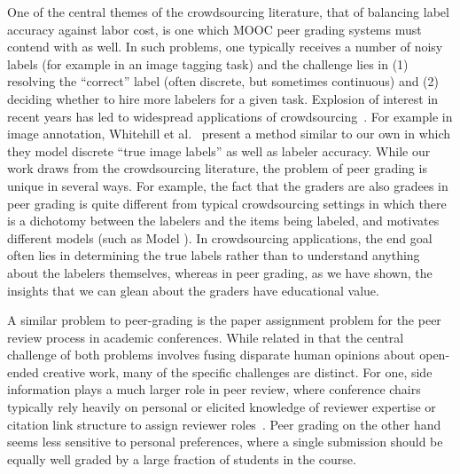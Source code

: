 One of the central themes of the crowdsourcing literature, that of balancing label accuracy against labor cost, is one which MOOC peer grading 
systems must contend with as well.
In such problems, one typically receives a number of noisy labels (for example in an image tagging task)
and the challenge lies in (1) resolving the ``correct'' label (often discrete, but sometimes continuous) 
and (2) deciding whether to hire more labelers for a given task.  
Explosion of interest in recent years has led to widespread applications of crowdsourcing~\cite{bachrach12,kamar12}.
For example in image annotation, Whitehill et al.~\cite{whitehill09} present a method similar to our
own in which they model discrete ``true image labels'' as well as labeler accuracy.
While our work draws from the crowdsourcing literature, the problem of peer grading is unique in several ways. For example,
the fact that the graders are also gradees in peer grading is
quite different from typical crowdsourcing settings in which there is a dichotomy between the labelers
and the items being labeled, and motivates different models (such as Model \PGthree). In crowdsourcing applications,
 the end goal often lies in determining the true labels rather than to understand anything
about the labelers themselves, whereas in peer grading, as we have shown, the insights that we can glean about the
graders have educational value.


A similar problem to peer-grading is the paper assignment problem for the peer review process in academic conferences.  
While related in that the central challenge of both problems involves fusing disparate human opinions about open-ended creative work,
many of the specific challenges are distinct.
For one, side information plays a much larger role in peer review, where conference chairs typically
rely heavily on personal or elicited knowledge of reviewer expertise or citation link structure to assign reviewer roles~\cite{charlin11}.
Peer grading on the other hand seems less sensitive to personal preferences, where a single submission should be equally
well graded by a large fraction of students in the course.

